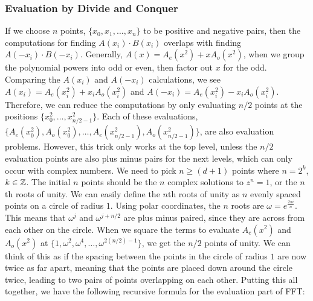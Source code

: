 \subsubsection{Evaluation by Divide and Conquer}
If we choose $n$ points, $\{x_0, x_1, \dots, x_n\}$ to be positive and negative pairs, then the computations for finding $A(x_i) \cdot B(x_i)$ overlaps with finding $A(-x_i) \cdot B(-x_i)$. Generally, $A(x) = A_e(x^2) + x A_o(x^2)$, when we group the polynomial powers into odd or even, then factor out $x$ for the odd. Comparing the $A(x_i)$ and $A(-x_i)$ calculations, we see $A(x_i) = A_e(x_i^2) + x_i A_o(x_i^2)$ and $A(-x_i) = A_e(x_i^2) - x_i A_o(x_i^2)$.
Therefore, we can reduce the computations by only evaluating $n/2$ points at the positions $\{x_0^2, \dots, x_{n/2 - 1}^2\}$.
Each of these evaluations, $\{A_e(x_0^2), A_o(x_0^2), \dots, A_e(x_{n/2 - 1}^2), A_o(x_{n/2 - 1}^2)\}$, are also evaluation problems.
However, this trick only works at the top level, unless the $n/2$ evaluation points are also plus minus pairs for the next levels, which can only occur with complex numbers.
We need to pick $n \geq (d+1)$ points where $n = 2^k$, $k \in \mathbb{Z}$.
The initial $n$ points should be the $n$ complex solutions to $z^n = 1$, or the $n$th roots of unity.
We can easily define the $n$th roots of unity as $n$ evenly spaced points on a circle of radius $1$.
Using polar coordinates, the $n$ roots are $\omega = e^{\frac{2 \pi i}{n}}$.
This means that $\omega^{j}$ and $\omega^{j+n/2}$ are plus minus paired, since they are across from each other on the circle.
When we square the terms to evaluate $A_e(x^2)$ and $A_o(x^2)$ at $\{1, \omega^2, \omega^4, \dots, \omega^{2(n/2)-1}\}$, we get the $n/2$ points of unity.
We can think of this as if the spacing between the points in the circle of radius $1$ are now twice as far apart, meaning that the points are placed down around the circle twice, leading to two pairs of points overlapping on each other.
Putting this all together, we have the following recursive formula for the evaluation part of FFT:
